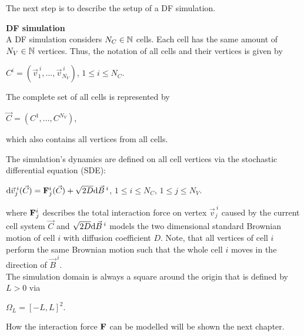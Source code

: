 The next step is to describe the setup of a DF simulation. 
\begin{definition} \textbf{DF simulation} \label{def:DF-Sim}  \\
	A DF simulation considers $N_C \in \mathbb{N}$ cells. 
	Each cell has the same amount of $N_V \in \mathbb{N}$ vertices.
	Thus, the notation of all cells and their vertices is given by 
	\begin{center}
		$C^{i} = (\vec{v}^{\:i}_1, \ldots, \vec{v}^{\:i}_{N_V})$, \hspace{0.5em} $1 \leq i \leq N_{C}$. 
	\end{center}

	The complete set of all cells is represented by 
	\begin{center}
		$\vec{C} = (C^{1}, \ldots, C^{N_V})$,
	\end{center}
	which also contains all vertices from all cells.

	The simulation's dynamics are defined on all cell vertices via the stochastic differential equation (SDE):
	\begin{center}
		$ \mathrm{d} \vec{v}^{\:i}_j(\vec{C}) = \mathbf{F}^i_j(\vec{C}) + \sqrt{2 D} \mathrm{d} \vec{B}^{\:i}$, \hspace{0.5em} $1 \leq i \leq N_{C}$, \hspace{0.5em} $1 \leq j \leq N_{V}$. 
	\end{center}
	where $\mathbf{F}^i_j$ describes the total interaction force on vertex $\vec{v}^{\:i}_j$ caused by the current cell system $\vec{C}$ and $\sqrt{2 D} \mathrm{d} \vec{B}^{\:i}$ models the two dimensional standard Brownian motion of cell $i$ with diffusion coefficient $D$.  
	Note, that all vertices of cell $i$ perform the same Brownian motion such that the whole cell $i$ moves in the direction of $\vec{B}^{\:i}$. \\

	The simulation domain is always a square around the origin that is defined by $L > 0$ via 
	\begin{center}
		$
		\Omega_L = [-L, L]^2.
		$
	\end{center} 
\end{definition}

How the interaction force $\mathbf{F}$ can be modelled will be shown the next chapter. 




